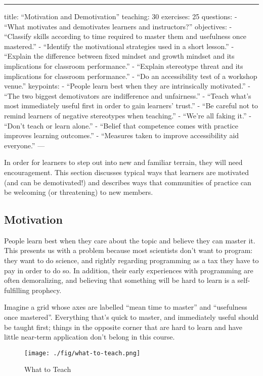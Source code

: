 \begin{center}
\rule{3in}{0.4pt}
\end{center}
title: ``Motivation and Demotivation''
teaching: 30
exercises: 25
questions:
- ``What motivates and demotivates learners and instructors?''
objectives:
- ``Classify skills according to time required to master them and usefulness once mastered.''
- ``Identify the motivational strategies used in a short lesson.''
- ``Explain the difference between fixed mindset and growth mindset and its implications for classroom performance.''
- ``Explain stereotype threat and its implications for classroom performance.''
- ``Do an accessibility test of a workshop venue.''
keypoints:
- ``People learn best when they are intrinsically motivated.''
- ``The two biggest demotivators are indifference and unfairness.''
- ``Teach what's most immediately useful first in order to gain learners' trust.''
- ``Be careful not to remind learners of negative stereotypes when teaching.''
- ``We're all faking it.''
- ``Don't teach or learn alone.''
- ``Belief that competence comes with practice improves learning outcomes.''
- ``Measures taken to improve accessibility aid everyone.''
---

In order for learners to step out into new and familiar terrain, they will
need encouragement.  This section discusses typical ways that
learners are motivated (and can be demotivated!) and describes ways that communities
of practice can be welcoming (or threatening) to new members.

\subsection*{Motivation}

People learn best when they care about the topic and believe they can master it.
This presents us with a problem
because most scientists don't want to program:
they want to do science,
and rightly regarding programming as a tax they have to pay in order to do so.
In addition,
their early experiences with programming are often demoralizing,
and believing that something will be hard to learn is a self-fulfilling prophecy.

Imagine a grid whose axes are labelled ``mean time to master'' and ``usefulness once mastered''.
Everything that's quick to master, and immediately useful should be taught first;
things in the opposite corner
that are hard to learn and have little near-term application
don't belong in this course.

\begin{figure}
\begin{center}
\texttt{[image: ./fig/what-to-teach.png]}
\end{center}
\caption{What to Teach}

\end{figure}


